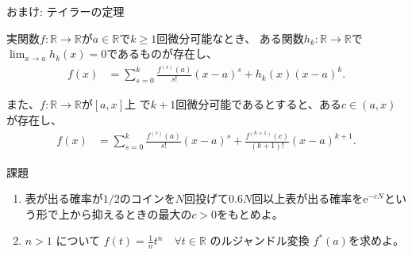 \documentclass[lualatex,handout]{beamer}
\theoremstyle{definition}
\begin{document}
\begin{frame}{おまけ: テイラーの定理}
\begin{theorem}[テイラーの定理]
実関数$f\colon\mathbb{R}\to\mathbb{R}$が$a\in\mathbb{R}$で$k\ge 1$回微分可能なとき、
ある関数$h_k\colon\mathbb{R}\to\mathbb{R}$で$\lim_{x\to a}h_k(x)=0$であるものが存在し、
\begin{align*}
f(x) &= \sum_{s=0}^k \frac{f^{(s)}(a)}{s!}(x-a)^s + h_k(x)(x-a)^k.
\end{align*}

また、$f\colon\mathbb{R}\to\mathbb{R}$が$[a, x]$上 で$k+1$回微分可能であるとすると、ある$c\in(a, x)$が存在し、
\begin{align*}
f(x) &= \sum_{s=0}^k \frac{f^{(s)}(a)}{s!}(x-a)^s + \frac{f^{(k+1)}(c)}{(k+1)!}(x-a)^{k+1}.
\end{align*}
\end{theorem}
\end{frame}

\begin{frame}{課題}
\begin{enumerate}
\setlength{\itemsep}{2em}
\item 表が出る確率が$1/2$のコインを$N$回投げて$0.6N$回以上表が出る確率を$\mathrm{e}^{-cN}$という形で上から抑えるときの最大の$c>0$をもとめよ。
\item $n> 1$ について $f(t) = \frac1n t^n \quad\forall t\in\mathbb{R}$ のルジャンドル変換 $f^*(a)$を求めよ。
\end{enumerate}
\end{frame}

\end{document}

